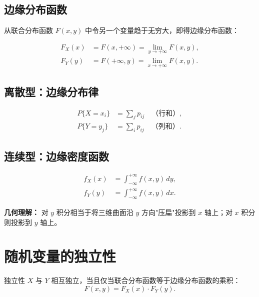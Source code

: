 \subsection{边缘分布函数}

从联合分布函数 $F(x, y)$ 中令另一个变量趋于无穷大，即得边缘分布函数：
\begin{myformula}
\[
\begin{aligned}
	F_X(x) &= F(x, +\infty) = \lim_{y \to +\infty} F(x, y), \\
	F_Y(y) &= F(+\infty, y) = \lim_{x \to +\infty} F(x, y).
\end{aligned}
\]
\end{myformula}

\subsection{离散型：边缘分布律}

\begin{myformula}
\[
\begin{aligned}
	P\{X = x_i\} &= \sum_{j} p_{ij} \quad\text{（行和）}, \\
	P\{Y = y_j\} &= \sum_{i} p_{ij} \quad\text{（列和）}.
\end{aligned}
\]
\end{myformula}

\subsection{连续型：边缘密度函数}

\begin{myformula}
\[
\begin{aligned}
	f_X(x) &= \int_{-\infty}^{+\infty} f(x, y)\,dy, \\
	f_Y(y) &= \int_{-\infty}^{+\infty} f(x, y)\,dx.
\end{aligned}
\]
\end{myformula}

\textbf{几何理解：} 对 $y$ 积分相当于将三维曲面沿 $y$ 方向"压扁"投影到 $x$ 轴上；对 $x$ 积分则投影到 $y$ 轴上。

\section{随机变量的独立性}

\begin{mydefinition}{独立性}
	$X$ 与 $Y$ 相互独立，当且仅当联合分布函数等于边缘分布函数的乘积：
	\[F(x, y) = F_X(x) \cdot F_Y(y).\]
\end{mydefinition}

